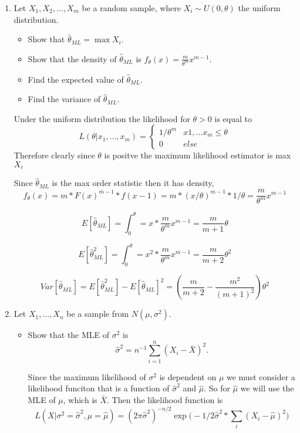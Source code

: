 \documentclass{article}
\begin{document}
\begin{enumerate}
\color{black}
\item
Let $X_1, X_2, \ldots, X_m$ be a random sample, where $X_i \sim U(0,\theta)$ the uniform distribution.
\begin{itemize}
\item Show that $\hat\theta_{ML} = \max X_i$.
\item Show that the density of $\hat\theta_{ML}$ is $f_\theta(x) = \frac{m}{\theta^m} x^{m-1}$.
\item Find the expected value of $\hat\theta_{ML}$.
\item Find the variance of $\hat\theta_{ML}$.
\end{itemize}

\color{blue}
Under the uniform distribution the likelihood for $\theta > 0$ is equal to
$$
L(\theta | x_1, ...,x_m) = \begin{cases} 
1 / \theta ^m & x1, ... x_m \leq \theta \\
0 & else
\end{cases}
$$
Therefore clearly since $\theta$ is positve the maximum likelihood estimator is max    
 $X_i$

Since $\hat{\theta}_{ML}$ is the max order statistic then it has density,
\[
f_\theta(x) = m * F(x)^{m-1} * f(x-1) = m * (x/\theta)^{m-1} * 1/\theta = \frac{m}{\theta^m}x^{m-1}
\]

\[
E[\hat{\theta}_{ML}] = \int_0^\theta = x * \frac{m}{\theta^m}x^{m-1} = \frac{m}{m+1} \theta
\]

\[
E[\hat{\theta}_{ML}^2] = \int_0^\theta = x^2 * \frac{m}{\theta^m}x^{m-1} = \frac{m}{m+2} \theta ^2
\]

\[
Var[\hat\theta_{ML}] = E[\hat{\theta}_{ML}^2] - E[\hat{\theta}_{ML}]^2 = (\frac{m}{m+2} - \frac{m^2}{(m+1)^2}) \theta^2
\]

\color{black}

\item
Let $X_1, \ldots, X_n$ be a sample from $N(\mu, \sigma^2)$.
\begin{itemize}
\item Show that the MLE of $\sigma^2$ is
$${\hat\sigma}^2 = n^{-1} \sum_{i=1}^n (X_i - \bar X)^2.$$

\color{blue}
Since the maximum likelihood of $\sigma^2$ is dependent on $\mu$ we must consider a likelihood funciton that is a function of $\hat{\sigma}^2$ and $\hat{\mu}$. So for $\hat{\mu}$ we will use the MLE of $\mu$, which is $\bar{X}$. 
Then the likelihood function is 
$$
L(X | \sigma^2 = \hat{\sigma}^2, \mu = \hat{\mu}) = (2\pi \hat \sigma^2)^{-n/2} \exp\big(-1/2\hat \sigma^2 * \sum_i (X_i - \hat{\mu})^2 \big)
$$ 


\end{itemize}
\end{enumerate}
\end{document}
